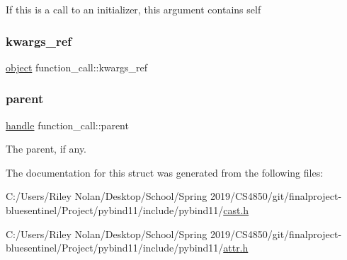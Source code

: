 If this is a call to an initializer, this argument contains {\ttfamily self} 

\mbox{\label{structfunction__call_a1ae7a6c18887e3c791b6cb16b2cc98c0}} 
\subsubsection{\texorpdfstring{kwargs\_ref}{kwargs\_ref}}
{\footnotesize\ttfamily \mbox{\hyperlink{classobject}{object}} function\+\_\+call\+::kwargs\+\_\+ref}

\mbox{\label{structfunction__call_a72923821447a70a799f862a501eee20d}} 
\subsubsection{\texorpdfstring{parent}{parent}}
{\footnotesize\ttfamily \mbox{\hyperlink{classhandle}{handle}} function\+\_\+call\+::parent}



The parent, if any. 



The documentation for this struct was generated from the following files\+:\begin{DoxyCompactItemize}
\item 
C\+:/\+Users/\+Riley Nolan/\+Desktop/\+School/\+Spring 2019/\+C\+S4850/git/finalproject-\/bluesentinel/\+Project/pybind11/include/pybind11/\mbox{\hyperlink{cast_8h}{cast.\+h}}\item 
C\+:/\+Users/\+Riley Nolan/\+Desktop/\+School/\+Spring 2019/\+C\+S4850/git/finalproject-\/bluesentinel/\+Project/pybind11/include/pybind11/\mbox{\hyperlink{attr_8h}{attr.\+h}}\end{DoxyCompactItemize}
